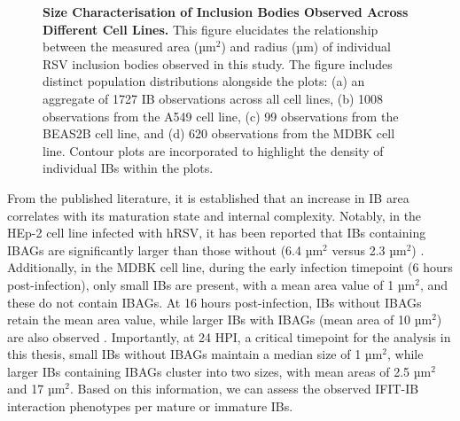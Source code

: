 \begin{figure}
\begin{subfigure}{0.495\textwidth}
    \end{subfigure}
    \caption[Size Characterisation of Inclusion Bodies Observed Across Different Cell Lines.]{\textbf{Size Characterisation of Inclusion Bodies Observed Across Different Cell Lines.} This figure elucidates the relationship between the measured area (\(\mbox{µm}^2\)) and radius (µm) of individual RSV inclusion bodies observed in this study. The figure includes distinct population distributions alongside the plots: (a) an aggregate of 1727 IB observations across all cell lines, (b) 1008 observations from the A549 cell line, (c) 99 observations from the BEAS2B cell line, and (d) 620 observations from the MDBK cell line. Contour plots are incorporated to highlight the density of individual IBs within the plots.}
    \label{fig:Size Characterization of Inclusion Bodies Observed Across Different Cell Lines}
\end{figure}

From the published literature, it is established that an increase in IB area correlates with its maturation state and internal complexity. Notably, in the HEp-2 cell line infected with hRSV, it has been reported that IBs containing IBAGs are significantly larger than those without (6.4 \(\mbox{µm}^2\) versus 2.3 \(\mbox{µm}^2\)) \cite{Rincheval2017FunctionalVirus}. Additionally, in the MDBK cell line, during the early infection timepoint (6 hours post-infection), only small IBs are present, with a mean area value of 1 \(\mbox{µm}^2\), and these do not contain IBAGs. At 16 hours post-infection, IBs without IBAGs retain the mean area value, while larger IBs with IBAGs (mean area of 10 \(\mbox{µm}^2\)) are also observed \cite{Jobe2021BovineResponses}. Importantly, at 24 HPI, a critical timepoint for the analysis in this thesis, small IBs without IBAGs maintain a median size of 1 \(\mbox{µm}^2\), while larger IBs containing IBAGs cluster into two sizes, with mean areas of 2.5 \(\mbox{µm}^2\) and 17 \(\mbox{µm}^2\). Based on this information, we can assess the observed IFIT-IB interaction phenotypes per mature or immature IBs.

